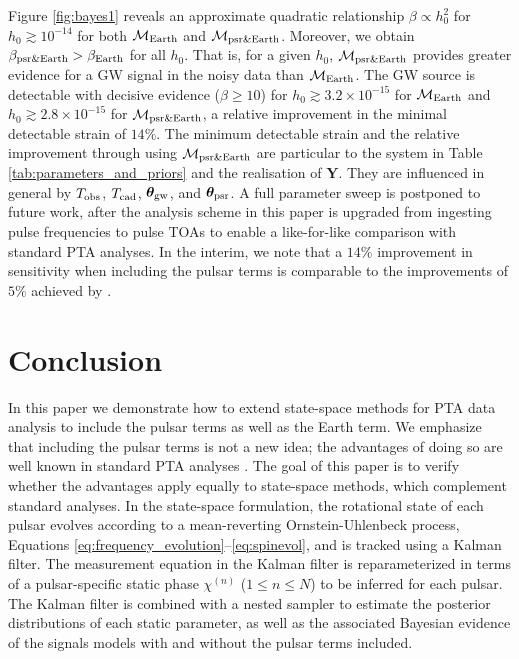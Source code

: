 \documentclass[fleqn,usenatbib,useAMS]{mnras}
\begin{document}
Figure \ref{fig:bayes1} reveals an approximate quadratic relationship $\beta \propto h_0^2$ for $h_0 \gtrsim 10^{-14}$ for both $\mathcal{M}_{\rm Earth}$ and $\mathcal{M}_{\rm psr \& Earth}$. Moreover, we obtain $\beta_{\rm psr \& Earth} > \beta_{\rm Earth}$ for all $h_0$. That is, for a given $h_0$, $\mathcal{M}_{\rm psr \& Earth}$ provides greater evidence for a GW signal in the noisy data than $\mathcal{M}_{\rm Earth}$. The GW source is detectable with decisive evidence ($\beta \geq 10$) for $h_0 \gtrsim 3.2 \times 10^{-15}$ for  $\mathcal{M}_{\rm Earth}$ and $h_0 \gtrsim 2.8 \times 10^{-15}$ for  $\mathcal{M}_{\rm psr \& Earth}$, a relative improvement in the minimal detectable strain of $14\%$. The minimum detectable strain and the relative improvement through using $\mathcal{M}_{\rm psr \& Earth}$ are particular to the system in Table \ref{tab:parameters_and_priors} and the realisation of $\boldsymbol{Y}$. They are influenced in general by $T_{\rm obs}$, $T_{\rm cad}$, ${\boldsymbol{\theta}}_{\rm gw}$, and ${\boldsymbol{\theta}}_{\rm psr}$. A full parameter sweep is postponed to future work, after the analysis scheme in this paper is upgraded from ingesting pulse frequencies to pulse TOAs to enable a like-for-like comparison with standard PTA analyses. In the interim, we note that a $14\%$ improvement in sensitivity when including the pulsar terms is comparable to the improvements of $5\%$ achieved by \cite{Zhupulsarterms}.
		
		
	
		
		
\section{Conclusion}\label{sec:discussion}
In this paper we demonstrate how to extend state-space methods for PTA data analysis to include the pulsar terms as well as the Earth term. We emphasize that including the pulsar terms is not a new idea; the advantages of doing so are well known in standard PTA analyses 
\citep[e.g.][]{Zhupulsarterms,Chen2022,2023ApJ...951L...8A,2023arXiv230616214A,2023ApJ...951L...6R,2023RAA....23g5024X,Arzoumanian2023,2023arXiv230616226A}. The goal of this paper is to verify whether the advantages apply equally to state-space methods, which complement standard analyses. In the state-space formulation, the rotational state of each pulsar evolves according to a mean-reverting Ornstein-Uhlenbeck process, Equations \eqref{eq:frequency_evolution}--\eqref{eq:spinevol}, and is tracked using a Kalman filter. The measurement equation in the Kalman filter is reparameterized in terms of a pulsar-specific static phase $\chi^{(n)}$ ($1 \leq n \leq N$) to be inferred for each pulsar. The Kalman filter is combined with a nested sampler to estimate the posterior distributions of each static parameter, as well as the associated Bayesian evidence of the signals models with and without the pulsar terms included. \newline 
\end{document}

